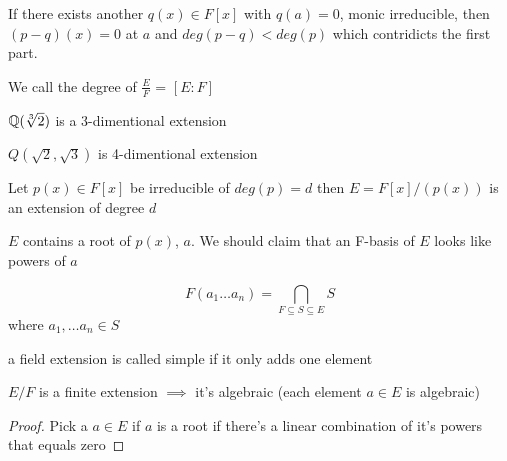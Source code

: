 
If there exists another \(q(x) \in F[x]\) with \(q(a) = 0\), monic irreducible, then \((p-q)(x) = 0\) at \(a\) and \(deg(p-q) < deg(p)\) which contridicts the first part.

\begin{definition}
	\label{def:e/f as vector-space}
	We call the degree of \(\frac{E}{F}\) = \([E:F]\)
\end{definition}

\begin{example}
	\(\mathbb{Q}(\sqrt[3]{2})\) is a 3-dimentional extension 
\end{example} 
\begin{example}
	\(Q(\sqrt{2},\sqrt{3})\) is 4-dimentional extension
\end{example} 

\begin{theorem}
	Let \(p(x) \in F[x]\)  be irreducible of \(deg(p) = d\) then \(E = F[x]/(p(x))\) is an extension of degree \(d\)
\end{theorem}
\begin{note}
	\(E\) contains a root of \(p(x)\), \(a\). We should claim that an F-basis of \(E\) looks like powers of \(a\) 
\end{note} 



\begin{definition}
	\label{def:field extension)}
	\[
		F(a_1 \ldots a_n) = \bigcap_{F \subseteq S \subseteq E} S
	\]
	where \(a_1, \ldots a_n \in S\) 
\end{definition}  

\begin{definition}[simple]
	\label{def:simple}
	a field extension is called simple if it only adds one element
\end{definition}

\begin{theorem}
	\(E/F\) is a finite extension \(\implies\) it's algebraic (each element \(a \in E\) is algebraic)
\end{theorem} 
\begin{proof}
	Pick a \(a \in E\) if \(a\) is a root if there's a linear combination of it's powers that equals zero 
\end{proof}


